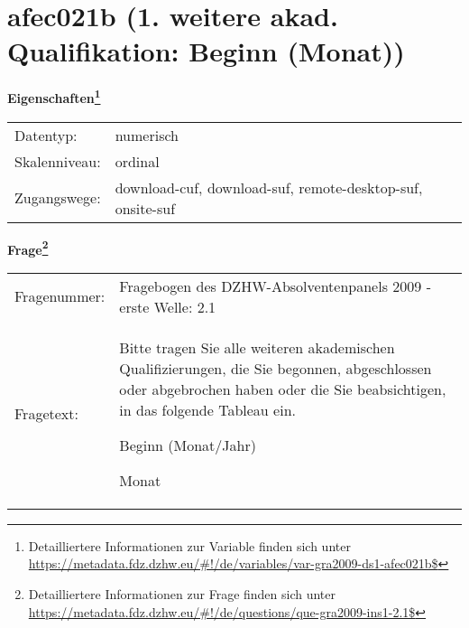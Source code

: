 
    \setcounter{footnote}{0}

    \vspace*{-1.8cm}
	\section{afec021b (1. weitere akad. Qualifikation: Beginn (Monat))}
	\label{section:afec021b}



    \vspace*{0.5cm}
    \noindent\textbf{Eigenschaften\footnote{Detailliertere Informationen zur Variable finden sich unter
		\url{https://metadata.fdz.dzhw.eu/\#!/de/variables/var-gra2009-ds1-afec021b$}}}\\
	\begin{tabularx}{\hsize}{@{}lX}
	Datentyp: & numerisch \\
	Skalenniveau: & ordinal \\
	Zugangswege: &
	  download-cuf, 
	  download-suf, 
	  remote-desktop-suf, 
	  onsite-suf
 \\
    \end{tabularx}



				\vspace*{0.5cm}
                \noindent\textbf{Frage\footnote{Detailliertere Informationen zur Frage finden sich unter
		              \url{https://metadata.fdz.dzhw.eu/\#!/de/questions/que-gra2009-ins1-2.1$}}}\\
				\begin{tabularx}{\hsize}{@{}lX}
					Fragenummer: &
					  Fragebogen des DZHW-Absolventenpanels 2009 - erste Welle:
					  2.1
 \\
					Fragetext: & Bitte tragen Sie alle weiteren akademischen Qualifizierungen, die Sie begonnen, abgeschlossen oder abgebrochen haben oder die Sie beabsichtigen, in das folgende Tableau ein.\par  Beginn (Monat/Jahr)\par  Monat \\
				\end{tabularx}





